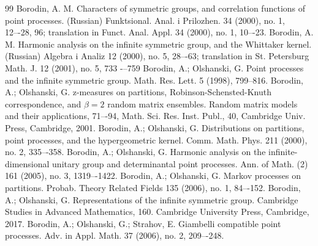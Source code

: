 \documentclass[12pt]{amsart}
\theoremstyle{definition}
\numberwithin{equation}{section}
\begin{document}
\begin{thebibliography}{99}
 Borodin, A. M. Characters of symmetric groups, and correlation functions of point processes. (Russian) Funktsional. Anal. i Prilozhen. 34 (2000), no. 1, 12–-28, 96; translation in Funct. Anal. Appl. 34 (2000), no. 1, 10–-23.
  Borodin, A. M. Harmonic analysis on the infinite symmetric group, and the Whittaker kernel. (Russian) Algebra i Analiz 12 (2000), no. 5, 28–-63; translation in St. Petersburg Math. J. 12 (2001), no. 5, 733
  -–759
 Borodin, A.; Olshanski, G. Point processes and the infinite symmetric group. Math. Res. Lett. 5 (1998), 799--816.
 Borodin, A.; Olshanski, G. z-measures on partitions, Robinson-Schensted-Knuth correspondence, and $\beta=2$ random matrix ensembles. Random matrix models and their applications, 71–-94, Math. Sci. Res. Inst. Publ., 40, Cambridge Univ. Press, Cambridge, 2001.
 Borodin, A.; Olshanski, G. Distributions on partitions, point processes, and the hypergeometric kernel. Comm. Math. Phys. 211 (2000), no. 2, 335–-358.
 Borodin, A.; Olshanski, G. Harmonic analysis on the infinite-dimensional unitary group and determinantal point processes. Ann. of Math. (2) 161 (2005), no. 3, 1319–-1422.
Borodin, A.; Olshanski, G. Markov processes on partitions. Probab. Theory Related Fields 135 (2006), no. 1, 84–-152.
Borodin, A.; Olshanski, G. Representations of the infinite symmetric group. Cambridge Studies in Advanced Mathematics, 160. Cambridge University Press, Cambridge, 2017.
 Borodin, A.; Olshanski, G.; Strahov, E. Giambelli compatible point processes. Adv. in Appl. Math. 37 (2006), no. 2, 209–-248.

\end{thebibliography}
\end{document}
